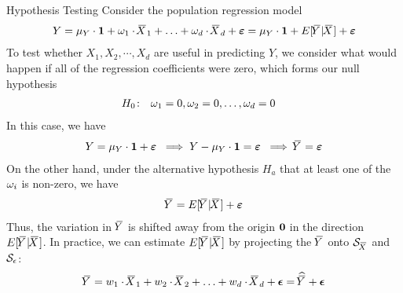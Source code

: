 %
\begin{frame}{Hypothesis Testing}
Consider the population regression model
\begin{align*}
    Y = \mu_Y \cdot \bone + \truew_1 \cdot \mX_1 + \ldots + \truew_d \cdot \mX_d +
    \bvepsilon = \mu_Y \cdot \bone + E[\mY|\mX] + \bvepsilon
\end{align*}
%
To test whether $X_1, X_2, \cdots, X_d$ are useful in predicting $Y$, we
consider what would happen if all of the regression coefficients were
zero, which forms our null hypothesis
\begin{align*}
H_0\!: & \quad \truew_1 = 0, \truew_2 = 0, \ldots, \truew_d = 0    
\end{align*}
In this case, we have 
\begin{align*}
Y = \mu_Y \cdot \bone + \bvepsilon\; \implies Y - \mu_Y\cdot\bone =
\bvepsilon\; \implies \mY = \bvepsilon  
\end{align*}
%
On the other hand, under the alternative hypothesis $H_a$ that at least
one of the $\truew_i$ is non-zero, we have
\begin{align*}
\mY = E[\mY|\mX] + \bvepsilon 
\end{align*}
Thus, the variation in
$\mY$ is shifted away from the origin $\bzero$ in the direction 
$E[\mY|\mX]$.
%
In practice, %
we can estimate $E[\mY|\mX]$ by projecting the 
$\mY$ onto 
$\cS_{\mX}$ and $\cS_\epsilon$:
\begin{align*}
    \mY = w_1 \cdot \mX_1 + w_2 \cdot \mX_2 + \ldots + w_d \cdot
\mX_d + \bepsilon = \hmY  + \bepsilon
\end{align*}
\end{frame}
%
